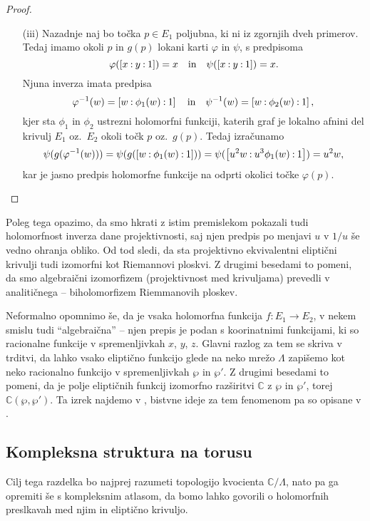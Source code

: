 \documentclass[mat1]{fmfdelo}
\numberwithin{equation}{section}
\newcommand{\C}{\mathbb C}
\newcommand{\inv}{^{-1}}
\newcommand{\pcoor}[1]{%
\begingroup\lccode`~=`: \lowercase{\endgroup
\edef~}{\mathbin{\mathchar\the\mathcode`:}\nobreak}%
\left[%
\begingroup
\mathcode`:=\string"8000
#1%
\endgroup
\right]%
}
\newcommand{\oz}{oz.\ }
\theoremstyle{definition}
\begin{document}
\begin{proof}
\begin{enumerate}
        \item[(iii)] Nazadnje naj bo točka $p \in E_1$ poljubna, ki ni iz zgornjih dveh primerov. Tedaj imamo okoli $p$ in $g(p)$ lokani karti $\varphi$ in $\psi$, s predpisoma
        \[
            \varphi(\pcoor{x : y : 1}) = x \quad \text{in} \quad
            \psi(\pcoor{x : y : 1}) = x. 
        \]   
        Njuna inverza imata predpisa
        \[
            \varphi\inv(w) = \pcoor{w : \phi_1(w) : 1} \quad \text{in} \quad
            \psi\inv(w) = \pcoor{w : \phi_2(w) : 1},
        \]
        kjer sta $\phi_1$ in $\phi_2$ ustrezni holomorfni funkciji, katerih graf je lokalno afnini del krivulj $E_1$ \oz $E_2$ okoli točk $p$ \oz $g(p)$. Tedaj izračunamo
        \[
            \psi(g(\varphi\inv(w))) =
            \psi(g(\pcoor{w : \phi_1(w) : 1})) =
            \psi(\pcoor{u^2 w : u^3 \phi_1(w) : 1}) = 
            u^2 w,
        \]
        kar je jasno predpis holomorfne funkcije na odprti okolici točke $\varphi(p)$. 
    \end{enumerate}
\end{proof}

Poleg tega opazimo, da smo hkrati z istim premislekom pokazali tudi holomorfnost inverza dane projektivnosti, saj njen predpis po menjavi $u$ v $1/u$ še vedno ohranja obliko. Od tod sledi, da sta projektivno ekvivalentni eliptični krivulji tudi izomorfni kot Riemannovi ploskvi. Z drugimi besedami to pomeni, da smo algebraični izomorfizem (projektivnost med krivuljama) prevedli v analitičnega -- biholomorfizem Riemmanovih ploskev.

Neformalno opomnimo še, da je vsaka holomorfna funkcija $f: E_1 \to E_2$, v nekem smislu tudi ``algebraična'' -- njen prepis je podan s koorinatnimi funkcijami, ki so racionalne funkcije v spremenljivkah $x$, $y$, $z$. Glavni razlog za tem se skriva v trditvi, da lahko vsako eliptično funkcijo glede na neko mrežo $\Lambda$ zapišemo kot neko racionalno funkcijo v spremenljivkah $\wp$ in $\wp'$. Z drugimi besedami to pomeni, da je polje eliptičnih funkcij izomorfno razširitvi $\C$ z $\wp$ in $\wp'$, torej $\C(\wp, \wp')$. Ta izrek najdemo v \cite[\textbf{1}, \S2, izrek 4]{LangEllfunc}, bistvne ideje za tem fenomenom pa so opisane v \cite[\S 2 in \S 3]{Stevenhagen}.




\subsection{Kompleksna struktura na torusu}
Cilj tega razdelka bo najprej razumeti topologijo kvocienta $\C/\Lambda$, nato pa ga opremiti še s kompleksnim atlasom, da bomo lahko govorili o holomorfnih preslkavah med njim in eliptično krivuljo. 
\end{document}
